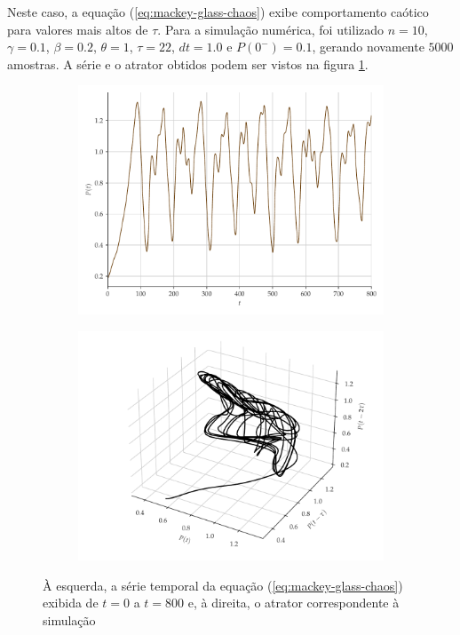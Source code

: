 \documentclass{article}
\begin{document}
Neste caso, a equação (\ref{eq:mackey-glass-chaos}) exibe comportamento caótico para valores mais altos de $\tau$. Para a simulação numérica, foi utilizado $n = 10$, $\gamma = 0.1$, $\beta = 0.2$, $\theta = 1$, $\tau = 22$, $dt = 1.0$ e $P(0^-)=0.1$, gerando novamente $5000$ amostras. A série e o atrator obtidos podem ser vistos na figura \ref{fig:mackey-glass}.
\begin{figure}[H]
     \begin{subfigure}[t]{0.2\textwidth}
         \includegraphics[scale=0.2]{serie-mackeyglass.pdf}
     \end{subfigure}
     \centering
     \begin{subfigure}[t]{0.2\textwidth}
         \includegraphics[scale=0.2]{atrator-mackeyglass.pdf}
     \end{subfigure}
     \caption{À esquerda, a série temporal da equação (\ref{eq:mackey-glass-chaos}) exibida de $t = 0 $ a $t = 800$ e, à direita, o atrator correspondente à simulação}
     \label{fig:mackey-glass}
\end{figure}
\end{document}
